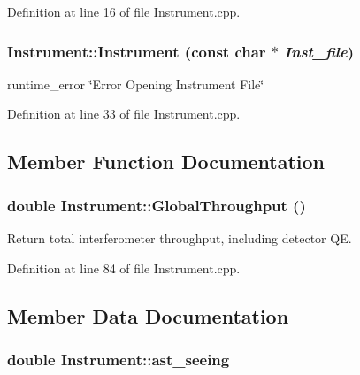 Definition at line 16 of file Instrument.cpp.

\hypertarget{classInstrument_a1842ca96cd3d19a634121fd5cafc6ff4}{
\subsubsection[{Instrument}]{\setlength{\rightskip}{0pt plus 5cm}Instrument::Instrument (const char $\ast$ {\em Inst\_\-file})}}
\label{classInstrument_a1842ca96cd3d19a634121fd5cafc6ff4}


runtime\_\-error \char`\"{}Error Opening Instrument File\char`\"{} 



Definition at line 33 of file Instrument.cpp.



\subsection{Member Function Documentation}
\hypertarget{classInstrument_aa43fea34962ffe530cc5cfb0dbaa67c2}{
\subsubsection[{GlobalThroughput}]{\setlength{\rightskip}{0pt plus 5cm}double Instrument::GlobalThroughput ()}}
\label{classInstrument_aa43fea34962ffe530cc5cfb0dbaa67c2}
Return total interferometer throughput, including detector QE. 

Definition at line 84 of file Instrument.cpp.



\subsection{Member Data Documentation}
\hypertarget{classInstrument_a508dcac890549428696372a66ed5d3bc}{
\subsubsection[{ast\_\-seeing}]{\setlength{\rightskip}{0pt plus 5cm}double {\bf Instrument::ast\_\-seeing}}}
\label{classInstrument_a508dcac890549428696372a66ed5d3bc}


